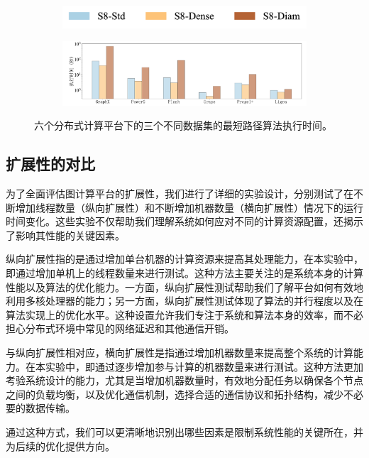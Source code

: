 \begin{figure}[h]\centering
    \begin{subfigure}[b]{0.7\textwidth}
        \includegraphics[width=\textwidth]{figures/legend_horizontal.pdf}
    \end{subfigure}

    \begin{subfigure}[b]{0.8\textwidth}
		\includegraphics[width=\textwidth]{figures/algorithm-sensitivity-SSSP_zh.pdf}
	\end{subfigure}
    \caption{六个分布式计算平台下的三个不同数据集的最短路径算法执行时间。}
    \label{C9-fig1}
\end{figure}

\subsection{扩展性的对比}

为了全面评估图计算平台的扩展性，我们进行了详细的实验设计，分别测试了在不断增加线程数量（纵向扩展性）和不断增加机器数量（横向扩展性）情况下的运行时间变化。这些实验不仅帮助我们理解系统如何应对不同的计算资源配置，还揭示了影响其性能的关键因素。

纵向扩展性指的是通过增加单台机器的计算资源来提高其处理能力，在本实验中，即通过增加单机上的线程数量来进行测试。这种方法主要关注的是系统本身的计算性能以及算法的优化能力。一方面，纵向扩展性测试帮助我们了解平台如何有效地利用多核处理器的能力；另一方面，纵向扩展性测试体现了算法的并行程度以及在算法实现上的优化水平。这种设置允许我们专注于系统和算法本身的效率，而不必担心分布式环境中常见的网络延迟和其他通信开销。

与纵向扩展性相对应，横向扩展性是指通过增加机器数量来提高整个系统的计算能力。在本实验中，即通过逐步增加参与计算的机器数量来进行测试。这种方法更加考验系统设计的能力，尤其是当增加机器数量时，有效地分配任务以确保各个节点之间的负载均衡，以及优化通信机制，选择合适的通信协议和拓扑结构，减少不必要的数据传输。

通过这种方式，我们可以更清晰地识别出哪些因素是限制系统性能的关键所在，并为后续的优化提供方向。

